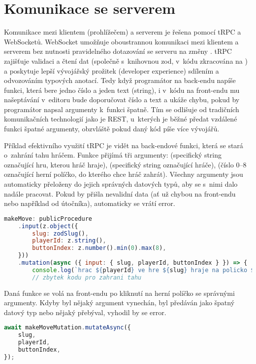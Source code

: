 \section{Komunikace se serverem}

Komunikace mezi klientem (prohlížečem) a serverem je řešena pomocí tRPC a
WebSocketů. WebSocket umožňuje oboustrannou komunikaci mezi klientem a serverem
bez nutnosti pravidelného dotazování se serveru na změny \cite{mdn-ws}. tRPC
zajišťuje validaci a čtení dat (společně s~knihovnou zod, v~kódu zkracována na
) a poskytuje lepší vývojářský prožitek (developer experience) sdílením a
odvozováním typových anotací. Tedy když programátor na back-endu napíše funkci,
která bere jedno číslo a jeden text (string), i v~kódu na front-endu mu
našeptávání v~editoru bude doporučovat číslo a text a ukáže chybu, pokud by
programátor napsal argumenty k~funkci špatně. Tím se odlišuje od tradičních
komunikačních technologií jako je REST, u~kterých je běžné předat vzdálené
funkci špatné argumenty, obzvláště pokud daný kód píše více vývojářů.

Příklad efektivního využití tRPC je vidět na back-endové funkci, která se stará
o~zahrání tahu hráčem. Funkce přijímá tři argumenty:  (specifický
string označující hru, kterou hráč hraje),  (specifický string
označující hráče),  (číslo 0--8 označující herní políčko, do
kterého chce hráč zahrát). Všechny argumenty jsou automaticky přeloženy do
jejich správných datových typů, aby se s~nimi dalo nadále pracovat. Pokud by
přišla nevalidní data (ať už chybou na front-endu nebo například od útočníka),
automaticky se vrátí error.

\begin{lstlisting}[language=JavaScript,caption={Funkce pro zahrání tahu},label={fig:be-make-move}]
makeMove: publicProcedure
    .input(z.object({
        slug: zodSlug(),
        playerId: z.string(),
        buttonIndex: z.number().min(0).max(8),
    }))
    .mutation(async ({ input: { slug, playerId, buttonIndex } }) => {
        console.log(`hrac ${playerId} ve hre ${slug} hraje na policko ${buttonIndex}`);
        // zbytek kodu pro zahrani tahu
\end{lstlisting}

Daná funkce se volá na front-endu po kliknutí na herní políčko se správnými
argumenty. Kdyby byl nějaký argument vynechán, byl předáván jako špatný datový
typ nebo nějaký přebýval, vyhodil by se error.

\begin{lstlisting}[language=JavaScript,caption={Volání funkce pro zahrání tahu},label={lst:make-move}]
await makeMoveMutation.mutateAsync({
    slug,
    playerId,
    buttonIndex,
});
\end{lstlisting}

